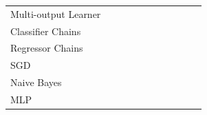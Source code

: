 \documentclass[twoside,11pt]{article}
\newcommand{\cmark}{\ding{51}}  %
\begin{document}
\begin{table}[!b]
\begin{threeparttable}[t]
\begin{tabular}{@{}lccccc|ccccc@{}}
    Multi-output Learner    & \cmark                                  & \cmark                              & \cmark                                 & \cmark                                & \tnote{*}                                & \cmark                        & \cmark                                          & \cmark                                             & \cmark                                     & \cite{bishop2006pattern}  \\
    Classifier Chains       & \cmark                                  &                                     & \cmark                                 & \cmark                                & \tnote{*}                                &                               & \cmark                                          & \cmark                                             & \cmark                                     & \cite{MEKA}  \\
    Regressor Chains        &                                         & \cmark                              & \cmark                                 & \cmark                                & \tnote{*}                                &                               & \cmark                                          & \cmark                                             & \cmark                                     & \cite{MEKA}  \\
    SGD                     & \cmark                                  & \cmark                              & \cmark                                 &                                       &                                          & \cmark                        & \cmark                                          & \cmark                                             & \cmark                                     & \cite{bishop2006pattern}  \\
    Naive Bayes             & \cmark                                  &                                     & \cmark                                 &                                       &                                          & \cmark                        & \cmark                                          & \cmark                                             & \cmark                                     & \cite{bishop2006pattern}  \\
    MLP                     & \cmark                                  & \cmark                              & \cmark                                 &                                       &                                          &                               & \cmark                                          & \cmark                                             & \cmark                                     & \cite{bishop2006pattern}  \\

\end{tabular}
\end{threeparttable}
\end{table}
\end{document}
